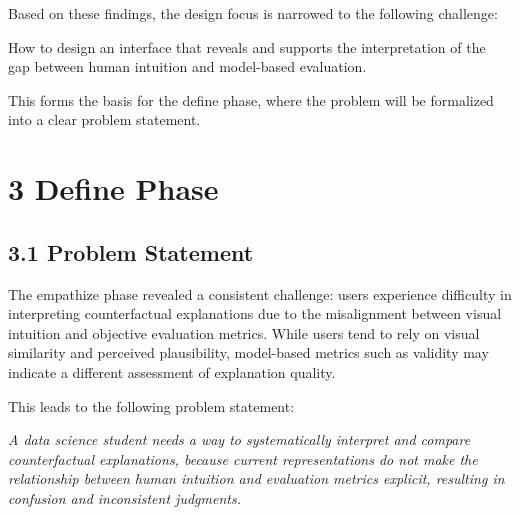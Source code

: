 \documentclass[
  letterpaper,
  DIV=11,
  numbers=noendperiod]{scrartcl}
\begin{document}
Based on these findings, the design focus is narrowed to the following
challenge:

\begin{tcolorbox}[enhanced jigsaw, breakable, left=2mm, colback=white, arc=.35mm, toprule=.15mm, rightrule=.15mm, colframe=quarto-callout-note-color-frame, bottomrule=.15mm, opacityback=0, leftrule=.75mm]
\begin{minipage}[t]{5.5mm}
\textcolor{quarto-callout-note-color}{\faInfo}
\end{minipage}%
\begin{minipage}[t]{\textwidth - 5.5mm}

How to design an interface that reveals and supports the interpretation
of the gap between human intuition and model-based evaluation.

\end{minipage}%
\end{tcolorbox}

This forms the basis for the define phase, where the problem will be
formalized into a clear problem statement.

\section{3 Define Phase}\label{define-phase}

\subsection{3.1 Problem Statement}\label{problem-statement}

The empathize phase revealed a consistent challenge: users experience
difficulty in interpreting counterfactual explanations due to the
misalignment between visual intuition and objective evaluation metrics.
While users tend to rely on visual similarity and perceived
plausibility, model-based metrics such as validity may indicate a
different assessment of explanation quality.

This leads to the following problem statement:

\begin{tcolorbox}[enhanced jigsaw, breakable, left=2mm, colback=white, arc=.35mm, toprule=.15mm, rightrule=.15mm, colframe=quarto-callout-note-color-frame, bottomrule=.15mm, opacityback=0, leftrule=.75mm]
\begin{minipage}[t]{5.5mm}
\textcolor{quarto-callout-note-color}{\faInfo}
\end{minipage}%
\begin{minipage}[t]{\textwidth - 5.5mm}

\emph{A data science student needs a way to systematically interpret and
compare counterfactual explanations, because current representations do
not make the relationship between human intuition and evaluation metrics
explicit, resulting in confusion and inconsistent judgments.}

\end{minipage}%
\end{tcolorbox}
\end{document}
